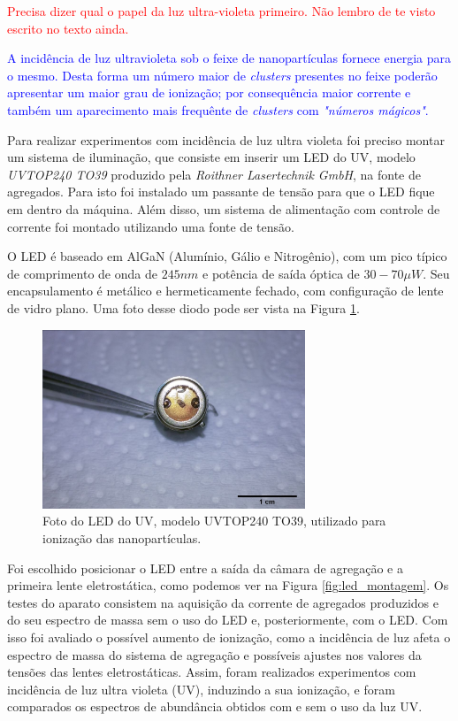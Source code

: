 \textcolor{red}{Precisa dizer qual o papel da luz ultra-violeta primeiro. Não lembro de te visto escrito no texto ainda.}

\textcolor{blue}{A incidência de luz ultravioleta sob o feixe de nanopartículas fornece energia para o mesmo. Desta forma um número maior de \textit{clusters} presentes no feixe poderão apresentar um maior grau de ionização; por consequência maior corrente e também um aparecimento mais frequênte de \textit{clusters} com \textit{"números mágicos"}.}

Para realizar experimentos com incidência de luz ultra violeta foi preciso montar um sistema de iluminação, que consiste em inserir um LED do UV, modelo \textit{UVTOP240 TO39} produzido pela \textit{Roithner Lasertechnik GmbH}, na fonte de agregados. Para isto foi instalado um passante de tensão para que o LED fique em dentro da máquina. Além disso, um sistema de alimentação com controle de corrente foi montado utilizando uma fonte de tensão.

O LED é baseado em AlGaN (Alumínio, Gálio e Nitrogênio), com um pico típico de comprimento de onda de $245 nm$ e potência de saída óptica de $30-70 \mu W$. Seu encapsulamento é metálico e hermeticamente fechado, com configuração de lente de vidro plano. Uma foto desse diodo pode ser vista na Figura \ref{fig:foto_led}.

\begin{figure}
  \centering
  \includegraphics[width=0.7\textwidth]{images/foca/led_scale}
  \caption{ Foto do LED do UV, modelo UVTOP240 TO39, utilizado para ionização das nanopartículas.  }
  \label{fig:foto_led}
\end{figure}


Foi escolhido posicionar o LED entre a saída da câmara de agregação e a primeira lente eletrostática, como podemos ver na Figura \ref{fig:led_montagem}. Os testes do aparato consistem na aquisição da corrente de agregados produzidos e do seu espectro de massa sem o uso do LED e, posteriormente, com o LED. Com isso foi avaliado o possível aumento de ionização, como a incidência de luz afeta o espectro de massa do sistema de agregação e possíveis ajustes nos valores da tensões das lentes eletrostáticas.
Assim, foram realizados experimentos com incidência de luz ultra violeta (UV), induzindo a sua ionização, e foram comparados os espectros de abundância obtidos com e sem o uso da luz UV. 



